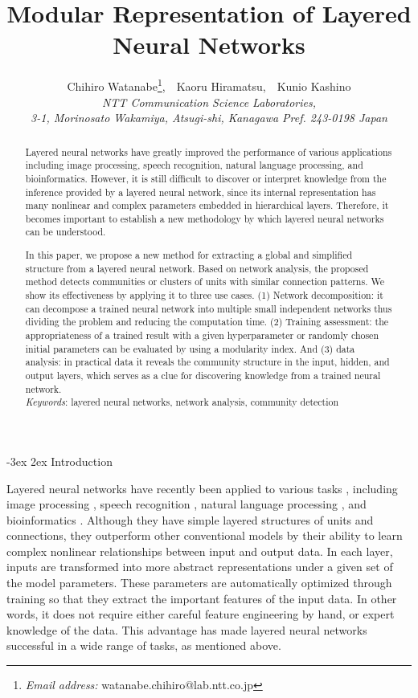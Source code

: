 \documentclass[12pt]{article} %
\title{{\Large Modular Representation of Layered Neural Networks}}
\author{{\normalsize Chihiro Watanabe}\thanks{\textit{Email address:} watanabe.chihiro@lab.ntt.co.jp}{\normalsize ,\ \ Kaoru Hiramatsu,\ \ Kunio Kashino}\\
{\small\itshape NTT Communication Science Laboratories,}\\{\small\itshape 3-1, Morinosato Wakamiya, Atsugi-shi, Kanagawa Pref. 243-0198 Japan}}
\date{}
\makeatletter
\renewcommand\section{\@startsection {section}{1}%
{\z@}%
{-3ex}%
{2ex}%
{\normalfont\normalsize\bfseries}}
\makeatother
\begin{document}
\maketitle

\begin{abstract}
{\normalsize Layered neural networks have greatly improved the performance of various applications including image processing, speech recognition, natural language processing, and bioinformatics. However, it is still difficult to discover or interpret knowledge from the inference provided by a layered neural network, since its internal representation has many nonlinear and complex parameters embedded in hierarchical layers. Therefore, it becomes important to establish a new methodology by which layered neural networks can be understood. 

In this paper, we propose a new method for extracting a global and simplified structure from a layered neural network. Based on network analysis, the proposed method detects communities or clusters of units with similar connection patterns. We show its effectiveness by applying it to three use cases. 
(1) Network decomposition: it can decompose a trained neural network into multiple small independent networks thus dividing the problem and reducing the computation time. (2) Training assessment: the appropriateness of a trained result with a given hyperparameter or randomly chosen initial parameters can be evaluated by using a modularity index. And (3) data analysis: in practical data it reveals the community structure in the input, hidden, and output layers, which serves as a clue for discovering knowledge from a trained neural network. \vspace{0.5em}\\
\textit{Keywords}: layered neural networks, network analysis, community detection}
\end{abstract}

\newpage

\section{Introduction} %
\label{sec:intro}

Layered neural networks have recently been applied to various tasks \cite{Bengio2013, LeCun2015}, including image processing \cite{Krizhevsky2012,Tompson2014}, speech recognition \cite{Hinton2012,Sainath2013}, natural language processing \cite{Collobert2011,Sutskever2014}, and bioinformatics \cite{Leung2014, Xiong2015}. Although they have simple layered structures of units and connections, they outperform other conventional models by their ability to learn complex nonlinear relationships between input and output data. In each layer, inputs are transformed into more abstract representations under a given set of the model parameters. These parameters are automatically optimized through training so that they extract the important features of the input data. In other words, it does not require either careful feature engineering by hand, or expert knowledge of the data. This advantage has made layered neural networks successful in a wide range of tasks, as mentioned above.
\end{document}
